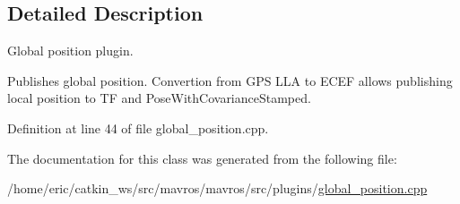 \subsection{Detailed Description}
Global position plugin. 

Publishes global position. Convertion from G\+PS L\+LA to E\+C\+EF allows publishing local position to TF and Pose\+With\+Covariance\+Stamped. 

Definition at line 44 of file global\+\_\+position.\+cpp.



The documentation for this class was generated from the following file\+:\begin{DoxyCompactItemize}
\item 
/home/eric/catkin\+\_\+ws/src/mavros/mavros/src/plugins/\mbox{\hyperlink{global__position_8cpp}{global\+\_\+position.\+cpp}}\end{DoxyCompactItemize}
